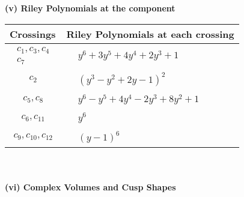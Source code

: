 \documentclass[1p]{elsarticle_modified}
\theoremstyle{definition}
\begin{document}
\newpage\renewcommand{\arraystretch}{1}
\flushleft \textbf{(v) Riley Polynomials at the component}\newline \\
\begin{tabular}{m{50pt}|m{274pt}}
Crossings & \hspace{64pt}Riley Polynomials at each crossing \\
\hline $$\begin{aligned}c_{1},c_{3},c_{4}\\c_{7}\end{aligned}$$&$\begin{aligned}
&y^6+3 y^5+4 y^4+2 y^3+1
\end{aligned}$\\
\hline $$\begin{aligned}c_{2}\end{aligned}$$&$\begin{aligned}
&(y^3- y^2+2 y-1)^2
\end{aligned}$\\
\hline $$\begin{aligned}c_{5},c_{8}\end{aligned}$$&$\begin{aligned}
&y^6- y^5+4 y^4-2 y^3+8 y^2+1
\end{aligned}$\\
\hline $$\begin{aligned}c_{6},c_{11}\end{aligned}$$&$\begin{aligned}
&y^6
\end{aligned}$\\
\hline $$\begin{aligned}c_{9},c_{10},c_{12}\end{aligned}$$&$\begin{aligned}
&(y-1)^6
\end{aligned}$\\
\hline
\end{tabular}\\~\\
\newpage\flushleft \textbf{(vi) Complex Volumes and Cusp Shapes}
\end{document}
